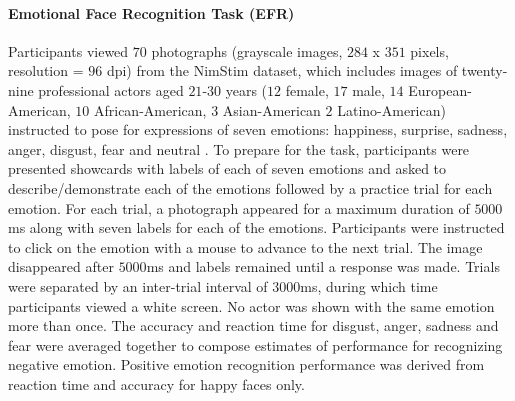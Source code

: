 \documentclass[utf8]{stylesheet}
\begin{document}
\paragraph{Emotional Face Recognition Task (EFR)} Participants viewed $70$ photographs (grayscale images, $284$ x $351$ pixels, resolution = $96$ dpi) from the NimStim dataset, which includes images of twenty-nine professional actors aged $21$-$30$ years ($12$ female, $17$ male, $14$ European-American, $10$ African-American, $3$ Asian-American $2$ Latino-American) instructed to pose for expressions of seven emotions: happiness, surprise, sadness, anger, disgust, fear and neutral \citep{tottenham2009nimstim}. To prepare for the task, participants were presented showcards with labels of each of seven emotions and asked to describe/demonstrate each of the emotions followed by a practice trial for each emotion. For each trial, a photograph appeared for a maximum duration of $5000$ms along with seven labels for each of the emotions. Participants were instructed to click on the emotion with a mouse to advance to the next trial. The image disappeared after $5000$ms and labels remained until a response was made. Trials were separated by an inter-trial interval of $3000$ms, during which time participants viewed a white screen. No actor was shown with the same emotion more than once. The accuracy and reaction time for disgust, anger, sadness and fear were averaged together to compose estimates of performance for recognizing negative emotion. Positive emotion recognition performance was derived from reaction time and accuracy for happy faces only. 
\end{document}
